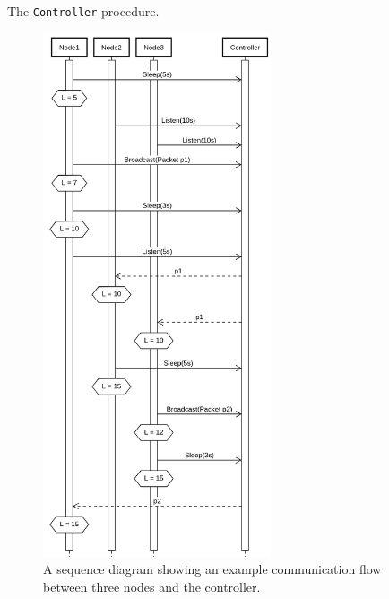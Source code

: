 \begin{algorithm}[H]
{{{                

            }



        }
    }
    \caption{The \texttt{Controller} procedure.}
    \label{algo:mpicontroller}
\end{algorithm}

\begin{figure}[H]
    \centering
    \includegraphics[width=0.6\textwidth]{figures/controller_sequence.png}
    \caption{A sequence diagram showing an example communication flow between three nodes and the controller.}
    \label{figure:mpi:controller:sequence-example}
\end{figure}

